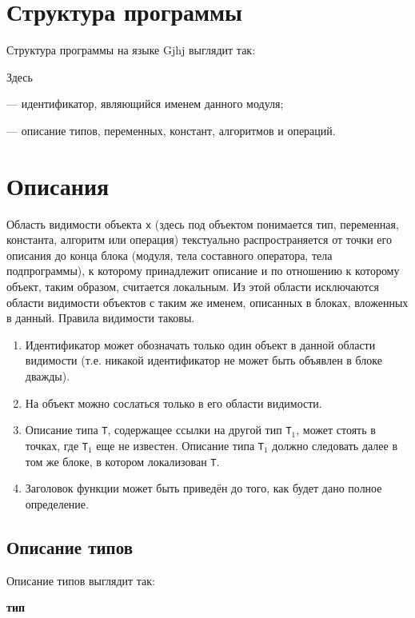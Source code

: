 \documentclass[10pt]{report}
\begin{document}
    \section{Структура программы}
Структура программы на языке Gjhj выглядит так:


Здесь

\noindent\textcolor{Green}{} --- идентификатор, являющийся именем данного модуля;

\noindent\textcolor{Green}{} --- описание типов, переменных, констант, алгоритмов и операций.


    \section{Описания}

Область видимости объекта \texttt{x} (здесь под объектом понимается тип, переменная, константа, алгоритм или операция) текстуально распространяется от точки его описания до
конца блока (модуля, тела составного оператора, тела подпрограммы), к которому принадлежит описание и по отношению к которому объект, таким образом, считается локальным. Из
этой области исключаются области видимости объектов с таким же именем, описанных в блоках, вложенных в данный. Правила видимости таковы.
\begin{enumerate}
    \item Идентификатор может обозначать только один объект в данной области видимости (т.е. никакой идентификатор не может быть объявлен в блоке дважды).
    \item На объект можно сослаться только в его области видимости.
    \item Описание типа \texttt{T}, содержащее ссылки на другой тип \texttt{T}$_1$, может стоять в точках, где \texttt{T}$_1$ еще не известен. Описание типа \texttt{T}$_1$
должно следовать далее в том же блоке, в котором локализован \texttt{T}.
    \item Заголовок функции может быть приведён до того, как будет дано полное определение.
\end{enumerate}

        \subsection{Описание типов}
Описание типов выглядит так:
\begin{center}
\noindent\textbf{тип} \textcolor{Green}{}
\end{center}
\end{document}
